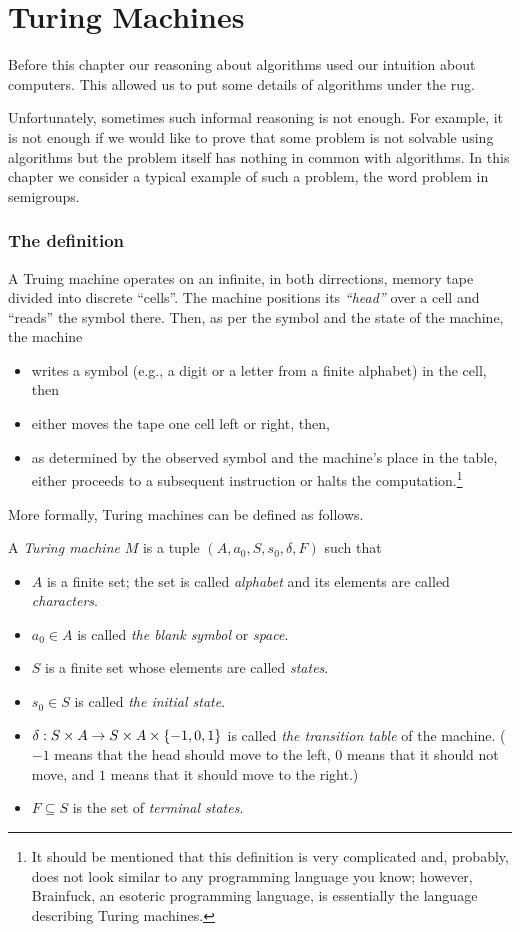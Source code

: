 \chapter{Turing Machines}
Before this chapter our reasoning about algorithms used our intuition about
computers. This allowed us to put some details of algorithms under the rug.

Unfortunately, sometimes such informal reasoning is not enough. For example, it
is not enough if we would like to prove that some problem is not solvable using
algorithms but the problem itself has nothing in common with algorithms. In this
chapter we consider a typical example of such a problem, the word problem in
semigroups.

\subsection{The definition}
A Truing machine operates on an infinite, in both dirrections, memory
tape divided into discrete ``cells''. The machine positions its \emph{``head''}
over a cell and ``reads'' the symbol there. Then, as per the symbol and the
state of the machine,
the machine
\begin{itemize}
  \item writes a symbol (e.g., a digit or a letter from a finite alphabet) in
    the cell, then
  \item either moves the tape one cell left or right, then,
  \item as determined by the observed symbol and the machine's place in the
    table, either proceeds to a subsequent instruction or halts the
    computation.\footnote{%
      It should be mentioned that this definition is very complicated and,
      probably, does not look similar to any programming language you know;
      however, Brainfuck, an esoteric programming language, is essentially the
      language describing Turing machines.
    }
\end{itemize}
More formally, Turing machines can be defined as follows.
\begin{definition}
  A \emph{Turing machine} $M$ is a tuple $(A, a_0, S, s_0, \delta, F)$ such
  that 
  \begin{itemize}
    \item $A$ is a finite set; the set is called \emph{alphabet} and its
      elements are called \emph{characters}.
    \item $a_0 \in A$ is called \emph{the blank symbol} or \emph{space}.
    \item $S$ is a finite set whose elements are called \emph{states}.
    \item $s_0 \in S$ is called \emph{the initial state}.
    \item $\delta : S \times A \to S \times A \times \set{-1, 0, 1}$ is called
      \emph{the transition table} of the machine. ($-1$ means that the head
      should move to the left, $0$ means that it should not move, and $1$ means
      that it should move to the right.)
    \item $F \subseteq S$ is the set of \emph{terminal states}.
  \end{itemize}
\end{definition}

